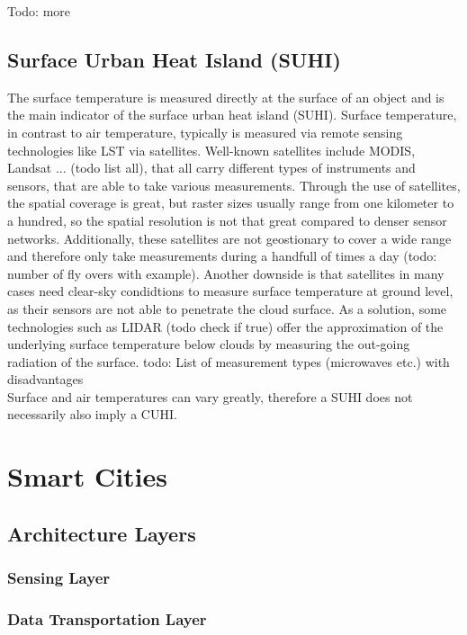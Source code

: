 Todo: more

\subsection{Surface Urban Heat Island (SUHI)}

The surface temperature is measured directly at the surface of an object and is the main indicator of the surface urban heat island (SUHI). Surface temperature, in contrast to air temperature, typically is measured via remote sensing technologies like LST via satellites. Well-known satellites include MODIS, Landsat ... (todo list all), that all carry different types of instruments and sensors, that are able to take various measurements. Through the use of satellites, the spatial coverage is great, but raster sizes usually range from one kilometer to a hundred, so the spatial resolution is not that great compared to denser sensor networks. Additionally, these satellites are not geostionary to cover a wide range and therefore only take measurements during a handfull of times a day (todo: number of fly overs with example). Another downside is that satellites in many cases need clear-sky condidtions to measure surface temperature at ground level, as their sensors are not able to penetrate the cloud surface. As a solution, some technologies such as LIDAR (todo check if true) offer the approximation of the underlying surface temperature below clouds by measuring the out-going radiation of the surface.
todo: List of measurement types (microwaves etc.) with disadvantages\\
Surface and air temperatures can vary greatly, therefore a SUHI does not necessarily also imply a CUHI.

\section{Smart Cities}

\subsection{Architecture Layers}

\subsubsection{Sensing Layer}

\subsubsection{Data Transportation Layer}

